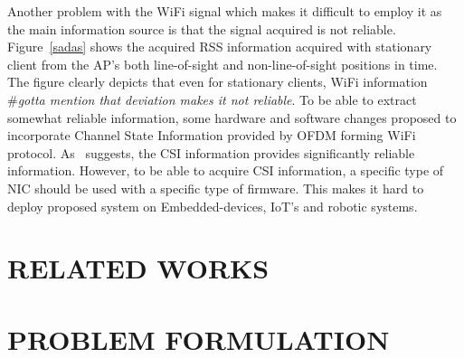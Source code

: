 \documentclass[letterpaper, 10 pt, conference]{ieeeconf}  %
\begin{document}
Another problem with the WiFi signal which makes it difficult to employ it as the main information source is that the signal acquired is not reliable.
Figure~\ref{sadas} shows the acquired RSS information acquired with stationary client from the AP's both line-of-sight and non-line-of-sight positions in time.
The figure clearly depicts that even for stationary clients, WiFi information \#\textit{gotta mention that deviation makes it not reliable}.
To be able to extract somewhat reliable information, some hardware and software changes proposed to incorporate Channel State Information provided by OFDM forming WiFi protocol.
As~\cite{gao2015channel} suggests, the CSI information provides significantly reliable information.
However, to be able to acquire CSI information, a specific type of NIC should be used with a specific type of firmware.
This makes it hard to deploy proposed system on Embedded-devices, IoT's and robotic systems.


%
%
%
\section{RELATED WORKS}



\section{PROBLEM FORMULATION}
\end{document}
